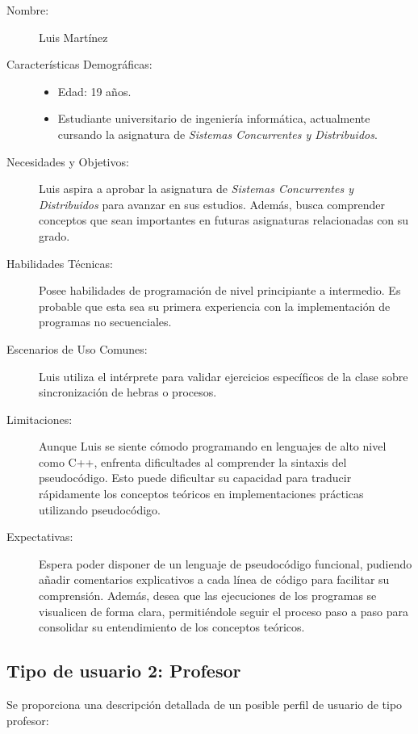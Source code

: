 \begin{description}
    \item[Nombre:] Luis Martínez
    \item[Características Demográficas:] \hfill
        \begin{itemize}
            \item Edad: 19 años.
            \item Estudiante universitario de ingeniería informática, actualmente cursando la asignatura de \textit{Sistemas Concurrentes y Distribuidos}.
        \end{itemize}
    \item[Necesidades y Objetivos:] Luis aspira a aprobar la asignatura de \textit{Sistemas Concurrentes y Distribuidos} para avanzar en sus estudios. Además, busca comprender conceptos que sean importantes en futuras asignaturas relacionadas con su grado.
    
    \item[Habilidades Técnicas:] Posee habilidades de programación de nivel principiante a intermedio. Es probable que esta sea su primera experiencia con la implementación de programas no secuenciales.
    
    \item[Escenarios de Uso Comunes:] Luis utiliza el intérprete para validar ejercicios específicos de la clase sobre sincronización de hebras o procesos.
    
    \item[Limitaciones:] Aunque Luis se siente cómodo programando en lenguajes de alto nivel como C++, enfrenta dificultades al comprender la sintaxis del pseudocódigo. Esto puede dificultar su capacidad para traducir rápidamente los conceptos teóricos en implementaciones prácticas utilizando pseudocódigo.
    
    \item[Expectativas:] Espera poder disponer de un lenguaje de pseudocódigo funcional, pudiendo añadir comentarios explicativos a cada línea de código para facilitar su comprensión. Además, desea que las ejecuciones de los programas se visualicen de forma clara, permitiéndole seguir el proceso paso a paso para consolidar su entendimiento de los conceptos teóricos.
\end{description}

\subsection{Tipo de usuario 2: Profesor}
Se proporciona una descripción detallada de un posible perfil de usuario de tipo profesor:

